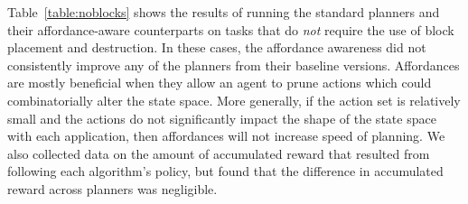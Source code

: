 \documentclass[]{article}
\newcommand{\stnote}[1]{\textcolor{Blue}{\textbf{ST: #1}}}
\newcommand{\dnote}[1]{\textcolor{Orange}{\textbf{D: #1}}}
\begin{document}

Table~\ref{table:noblocks} shows the results of running the standard
planners and their affordance-aware counterparts on tasks that do {\it
  not} require the use of block placement and destruction.  In these
cases, the affordance awareness did not consistently improve any of
the planners from their baseline versions. Affordances are mostly
beneficial when they allow an agent to prune actions which could
combinatorially alter the state space. More generally, if the action
set is relatively small and the actions do not significantly impact
the shape of the state space with each application, then affordances
will not increase speed of planning.  We also collected data on the
amount of accumulated reward that resulted from following each
algorithm's policy, but found that the difference in accumulated
reward across planners was negligible.



\end{document}
